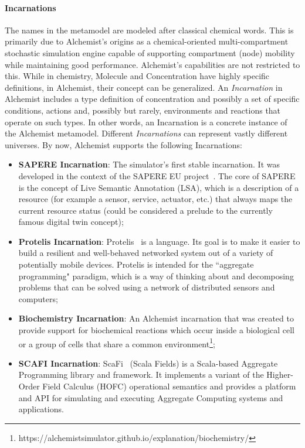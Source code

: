 
\paragraph{Incarnations} The names in the metamodel are modeled after classical chemical words. This is primarily due to Alchemist's origins as a chemical-oriented multi-compartment stochastic simulation engine capable of supporting compartment (node) mobility while maintaining good performance. Alchemist's capabilities are not restricted to this. While in chemistry, Molecule and Concentration have highly specific definitions, in Alchemist, their concept can be generalized. An \textit{Incarnation} in Alchemist includes a type definition of concentration and possibly a set of specific conditions, actions and, possibly but rarely, environments and reactions that operate on such types. In other words, an Incarnation is a concrete instance of the Alchemist metamodel.\newline
Different \textit{Incarnations} can represent vastly different universes. By now, Alchemist supports the following Incarnations:
\begin{itemize}
	\item \textbf{SAPERE Incarnation}: The simulator's first stable incarnation. It was developed in the context of the SAPERE EU project~\cite{sapere}. The core of SAPERE is the concept of Live Semantic Annotation (LSA), which is a description of a resource (for example a sensor, service, actuator, etc.) that always maps the current resource status (could be considered a prelude to the currently famous digital twin concept);
	\item \textbf{Protelis Incarnation}: Protelis~\cite{protelis} is a language. Its goal is to make it easier to build a resilient and well-behaved networked system out of a variety of potentially mobile devices. Protelis is intended for the ``aggregate programming" paradigm, which is a way of thinking about and decomposing problems that can be solved using a network of distributed sensors and computers;
	\item \textbf{Biochemistry Incarnation}: An Alchemist incarnation that was created to provide support for biochemical reactions which occur inside a biological cell or a group of cells that share a common environment\footnote{https://alchemistsimulator.github.io/explanation/biochemistry/};
	\item \textbf{SCAFI Incarnation}: ScaFi~\cite{CASADEI2022101248} (Scala Fields) is a Scala-based Aggregate Programming library and framework. It implements a variant of the Higher-Order Field Calculus (HOFC) operational semantics and provides a platform and API for simulating and executing Aggregate Computing systems and applications.
\end{itemize}


